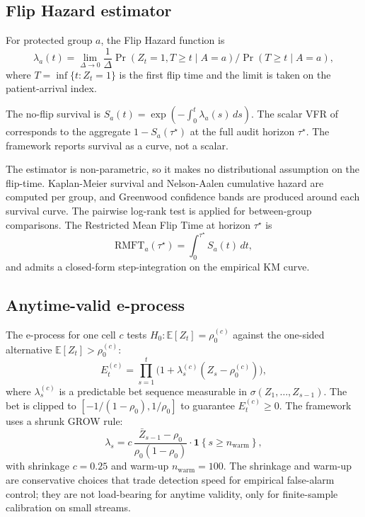 \documentclass[acmsmall,nonacm,review,anonymous]{acmart}
\newcommand{\E}{\mathbb{E}}
\newcommand{\1}[1]{\mathbf{1}\!\left\{#1\right\}}
\begin{document}
\subsection{Flip Hazard estimator}\label{sec:fliphazard}

\begin{definition}
For protected group $a$, the Flip Hazard function is
\begin{equation}
\lambda_a(t) = \lim_{\Delta \to 0} \frac{1}{\Delta} \Pr(Z_t = 1, T \ge t \mid A = a) \big/ \Pr(T \ge t \mid A = a),
\end{equation}
where $T = \inf\{t : Z_t = 1\}$ is the first flip time and the limit is taken on the patient-arrival index.
\end{definition}

The no-flip survival is $S_a(t) = \exp(-\int_0^t \lambda_a(s)\,ds)$. The scalar VFR of \cite{joy2025vfr} corresponds to the aggregate $1 - S_a(\tau^\star)$ at the full audit horizon $\tau^\star$. The framework reports survival as a curve, not a scalar.

The estimator is non-parametric, so it makes no distributional assumption on the flip-time. Kaplan-Meier survival \cite{kaplan1958} and Nelson-Aalen cumulative hazard \cite{nelson1972} are computed per group, and Greenwood confidence bands are produced around each survival curve. The pairwise log-rank test \cite{andersen1985} is applied for between-group comparisons. The Restricted Mean Flip Time at horizon $\tau^\star$ is
\begin{equation}
\mathrm{RMFT}_a(\tau^\star) = \int_0^{\tau^\star} S_a(t)\,dt,
\end{equation}
and admits a closed-form step-integration on the empirical KM curve.

\subsection{Anytime-valid e-process}\label{sec:eprocess}

The e-process for one cell $c$ tests $H_0 \colon \E[Z_t] = \rho_0^{(c)}$ against the one-sided alternative $\E[Z_t] > \rho_0^{(c)}$:
\begin{equation}
E_t^{(c)} = \prod_{s = 1}^{t} \bigl(1 + \lambda_s^{(c)} (Z_s - \rho_0^{(c)})\bigr),
\end{equation}
where $\lambda_s^{(c)}$ is a predictable bet sequence measurable in $\sigma(Z_1, \ldots, Z_{s-1})$. The bet is clipped to $[-1/(1-\rho_0), 1/\rho_0]$ to guarantee $E_t^{(c)} \ge 0$. The framework uses a shrunk GROW rule:
\begin{equation}
\lambda_s = c\,\frac{\bar Z_{s-1} - \rho_0}{\rho_0(1 - \rho_0)} \cdot \1{s \ge n_{\mathrm{warm}}},
\end{equation}
with shrinkage $c = 0.25$ and warm-up $n_{\mathrm{warm}} = 100$. The shrinkage and warm-up are conservative choices that trade detection speed for empirical false-alarm control; they are not load-bearing for anytime validity, only for finite-sample calibration on small streams.
\end{document}
